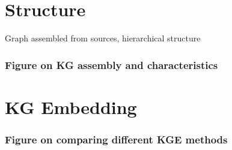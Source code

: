     

\section{Structure}

Graph assembled from sources, hierarchical structure

\subsubsection{Figure on KG assembly and characteristics}

\section{KG Embedding}

\subsubsection{Figure on comparing different KGE methods}

